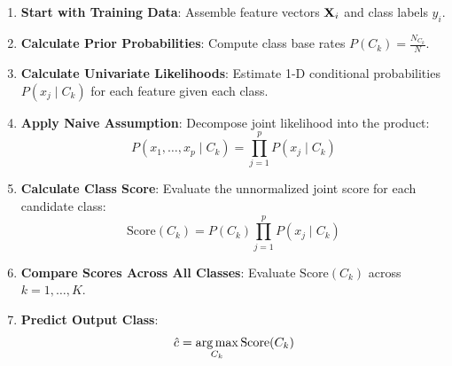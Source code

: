 \begin{algorithmbox}
\begin{enumerate}[leftmargin=1.5em, label=\roman*)]
    \item \textbf{Start with Training Data}: Assemble feature vectors $\mathbf{X}_i$ and class labels $y_i$.
    \item \textbf{Calculate Prior Probabilities}: Compute class base rates $P(C_k) = \frac{N_{C_k}}{N}$.
    \item \textbf{Calculate Univariate Likelihoods}: Estimate 1-D conditional probabilities $P(x_j \mid C_k)$ for each feature given each class.
    \item \textbf{Apply Naive Assumption}: Decompose joint likelihood into the product:
    $$P(x_1, \dots, x_p \mid C_k) = \prod_{j=1}^p P(x_j \mid C_k)$$
    \item \textbf{Calculate Class Score}: Evaluate the unnormalized joint score for each candidate class:
    $$\text{Score}(C_k) = P(C_k) \prod_{j=1}^p P(x_j \mid C_k)$$
    \item \textbf{Compare Scores Across All Classes}: Evaluate $\text{Score}(C_k)$ across $k = 1, \dots, K$.
    \item \textbf{Predict Output Class}:
    $$\hat{c} = \operatorname*{arg\,max}_{C_k} \text{Score}(C_k)$$
\end{enumerate}
\end{algorithmbox}
